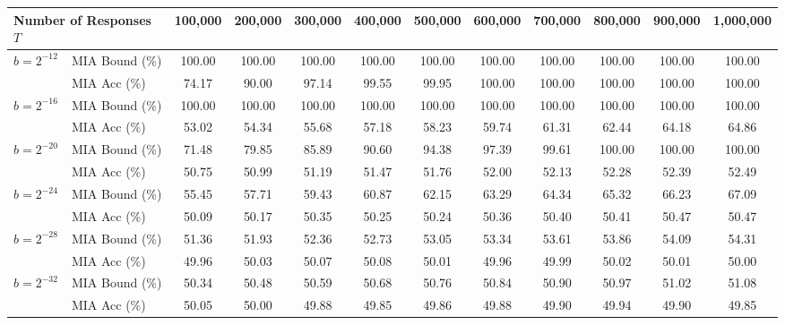 \begin{tabular}{llcccccccccc}
\toprule
\multicolumn{2}{l}{Number of Responses $T$} & 100,000 & 200,000 & 300,000 & 400,000 & 500,000 & 600,000 & 700,000 & 800,000 & 900,000 & 1,000,000 \\
\midrule
\multirow{2}{*}{$b=2^{-12}$} & MIA Bound (\%) & 100.00 & 100.00 & 100.00 & 100.00 & 100.00 & 100.00 & 100.00 & 100.00 & 100.00 & 100.00 \\
 & MIA Acc (\%) & 74.17 & 90.00 & 97.14 & 99.55 & 99.95 & 100.00 & 100.00 & 100.00 & 100.00 & 100.00 \\
\midrule
\multirow{2}{*}{$b=2^{-16}$} & MIA Bound (\%) & 100.00 & 100.00 & 100.00 & 100.00 & 100.00 & 100.00 & 100.00 & 100.00 & 100.00 & 100.00 \\
 & MIA Acc (\%) & 53.02 & 54.34 & 55.68 & 57.18 & 58.23 & 59.74 & 61.31 & 62.44 & 64.18 & 64.86 \\
\midrule
\multirow{2}{*}{$b=2^{-20}$} & MIA Bound (\%) & 71.48 & 79.85 & 85.89 & 90.60 & 94.38 & 97.39 & 99.61 & 100.00 & 100.00 & 100.00 \\
 & MIA Acc (\%) & 50.75 & 50.99 & 51.19 & 51.47 & 51.76 & 52.00 & 52.13 & 52.28 & 52.39 & 52.49 \\
\midrule
\multirow{2}{*}{$b=2^{-24}$} & MIA Bound (\%) & 55.45 & 57.71 & 59.43 & 60.87 & 62.15 & 63.29 & 64.34 & 65.32 & 66.23 & 67.09 \\
 & MIA Acc (\%) & 50.09 & 50.17 & 50.35 & 50.25 & 50.24 & 50.36 & 50.40 & 50.41 & 50.47 & 50.47 \\
\midrule
\multirow{2}{*}{$b=2^{-28}$} & MIA Bound (\%) & 51.36 & 51.93 & 52.36 & 52.73 & 53.05 & 53.34 & 53.61 & 53.86 & 54.09 & 54.31 \\
 & MIA Acc (\%) & 49.96 & 50.03 & 50.07 & 50.08 & 50.01 & 49.96 & 49.99 & 50.02 & 50.01 & 50.00 \\
\midrule
\multirow{2}{*}{$b=2^{-32}$} & MIA Bound (\%) & 50.34 & 50.48 & 50.59 & 50.68 & 50.76 & 50.84 & 50.90 & 50.97 & 51.02 & 51.08 \\
 & MIA Acc (\%) & 50.05 & 50.00 & 49.88 & 49.85 & 49.86 & 49.88 & 49.90 & 49.94 & 49.90 & 49.85 \\
\bottomrule
\end{tabular}
